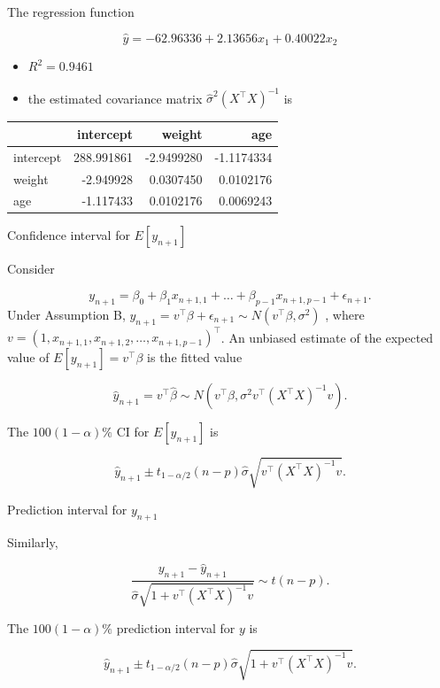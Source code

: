 \documentclass[ignorenonframetext,]{beamer}
\providecommand{\tightlist}{%
  \setlength{\itemsep}{0pt}\setlength{\parskip}{0pt}}
\begin{document}
\begin{frame}{The regression function}
\protect\hypertarget{the-regression-function}{}

\[\hat y = -62.96336 + 2.13656 x_1+ 0.40022 x_2\]

\begin{itemize}
\tightlist
\item
  \(R^2=0.9461\)
\item
  the estimated covariance matrix \(\hat{\sigma}^2(X^\top X)^{-1}\) is
\end{itemize}

\begin{longtable}[]{@{}lrrr@{}}
\toprule
& intercept & weight & age\tabularnewline
\midrule
\endhead
intercept & 288.991861 & -2.9499280 & -1.1174334\tabularnewline
weight & -2.949928 & 0.0307450 & 0.0102176\tabularnewline
age & -1.117433 & 0.0102176 & 0.0069243\tabularnewline
\bottomrule
\end{longtable}

\end{frame}

\begin{frame}{Confidence interval for \(E[y_{n+1}]\)}
\protect\hypertarget{confidence-interval-for-ey_n1}{}

Consider

\[y_{n+1} = \beta_0+\beta_1x_{n+1,1}+\dots+\beta_{p-1}x_{n+1,p-1}+\epsilon_{n+1}.\]
Under Assumption B,
\(y_{n+1}=v^\top \beta+\epsilon_{n+1}\sim N(v^\top \beta,\sigma^2)\) ,
where \(v = (1,x_{n+1,1},x_{n+1,2},\dots,x_{n+1,p-1})^\top\). An
unbiased estimate of the expected value of \(E[y_{n+1}]=v^\top \beta\)
is the fitted value

\[\hat y_{n+1} = v^\top \hat\beta \sim N(v^\top \beta, \sigma^2 v^\top(X^\top X)^{-1}v).\]

The \(100(1-\alpha)\%\) CI for \(E[y_{n+1}]\) is

\[\hat y_{n+1}\pm t_{1-\alpha/2}(n-p)\hat{\sigma}\sqrt{v^\top(X^\top X)^{-1}v}.\]

\end{frame}

\begin{frame}{Prediction interval for \(y_{n+1}\)}
\protect\hypertarget{prediction-interval-for-y_n1}{}

Similarly,

\[\frac{y_{n+1}-\hat y_{n+1}}{\hat{\sigma}\sqrt{1+v^\top(X^\top X)^{-1}v}}\sim t(n-p).\]

The \(100(1-\alpha)\%\) prediction interval for \(y\) is

\[\hat y_{n+1}\pm t_{1-\alpha/2}(n-p)\hat{\sigma}\sqrt{1+v^\top(X^\top X)^{-1}v}.\]

\end{frame}
\end{document}
